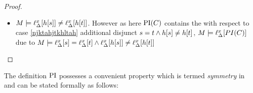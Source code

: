 \begin{proof}
\begin{itemize}
\begin{enumerate}
\begin{itemize}
					\item 
						$M \models \ell_{\Delta}^{x}[h[s]] \neq \ell_{\Delta}^{x}[h[t]]$.
						However as here $\operatorname{PI}(C)$ contains the with respect to case \ref{njktahjtkhltah} additional disjunct $s=t \land h[s] \neq h[t]$,
						$M \models \ell_{\Delta}^{x}[PI(C)]$ due to $M \models \ell_{\Delta}^{x}[s]=\ell_{\Delta}^{x}[t] \land \ell_{\Delta}^{x}[h[s]] \neq \ell_{\Delta}^{x}[h[t]]$
					\qedhere
					\end{itemize}
			\end{enumerate}

	\end{itemize}

\end{proof}



The definition $\operatorname{PI}$ possesses a convenient property which is termed \emph{symmetry} in \cite[Definition 5]{interpolantStrenth} and can be stated formally as follows:

